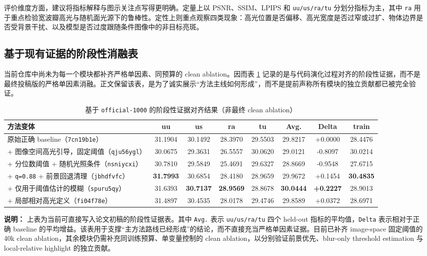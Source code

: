 \documentclass[UTF8,a4paper]{ctexart}
\begin{document}
评价维度方面，建议将指标解释与图示关注点写得更明确。定量上以 PSNR、SSIM、LPIPS 和 \texttt{uu/us/ra/tu} 分划分指标为主，其中 \texttt{ra} 用于重点检验宽波瓣高光与随机面光源下的鲁棒性。定性上则重点观察四类现象：高光位置是否偏移、高光宽度是否过窄或过扩、物体边界是否受背景干扰、以及模型是否过度跟随条件图像中的非目标亮斑。

\subsection{基于现有证据的阶段性消融表}

当前仓库中尚未为每一个模块都补齐严格单因素、同预算的 clean ablation。因而表 \ref{tab:evidence_ablation_cn} 记录的是与代码演化过程对齐的阶段性证据，而不是最终投稿版的严格单因素消融。正文保留该表，是为了诚实展示“方法主线如何形成”，而不是提前声称所有模块的独立贡献都已被完全验证。

\begin{table}[htbp]
\centering
\small
\setlength{\tabcolsep}{3.8pt}
\caption{基于 \texttt{official-1000} 的阶段性证据对齐结果（非最终 clean ablation）}
\label{tab:evidence_ablation_cn}
\begin{tabular}{p{3.9cm}ccccccc}
\toprule
方法变体 & uu & us & ra & tu & Avg. & Delta & train \\
\midrule
原始正确 baseline（\texttt{7cn19b1e}） & 31.1904 & 30.1492 & 28.3970 & 29.5503 & 29.8217 & +0.0000 & 28.4476 \\
+ 图像空间高光引导，固定阈值（\texttt{qju56ygl}） & 30.0675 & 29.3631 & 26.5557 & 30.0620 & 29.0121 & -0.8097 & 30.0214 \\
+ 分位数阈值 + 随机光照条件（\texttt{nsniycxi}） & 30.7810 & 29.5849 & 25.4691 & 29.6327 & 28.8669 & -0.9548 & 27.6715 \\
+ \texttt{q=0.88} + 前景回退清理（\texttt{jbhdfvfc}） & \textbf{31.7993} & 30.6854 & 28.4180 & 28.9659 & 29.9672 & +0.1454 & \textbf{30.4835} \\
+ 仅用于阈值估计的模糊（\texttt{spuru5qy}） & 31.6393 & \textbf{30.7137} & \textbf{28.9569} & 28.8678 & \textbf{30.0444} & \textbf{+0.2227} & 28.9013 \\
+ 局部相对高光定义（\texttt{fi04f78e}） & 31.4897 & 30.4535 & 28.0178 & 29.4746 & 29.8589 & +0.0372 & 28.6971 \\
\bottomrule
\end{tabular}
\end{table}

\noindent\textbf{说明：} 上表为当前可直接写入论文初稿的阶段性证据表。其中 \texttt{Avg.} 表示 \texttt{uu/us/ra/tu} 四个 held-out 指标的平均值，\texttt{Delta} 表示相对于正确 baseline 的平均增益。该表用于支撑“主方法路线已经形成”的结论，而不直接充当严格单因素证据。目前已补齐 image-space 固定阈值的 40k clean ablation，其余模块仍需补充同训练预算、单变量控制的 clean ablation，以分别验证前景优先、blur-only threshold estimation 与 local-relative highlight 的独立贡献。
\end{document}
